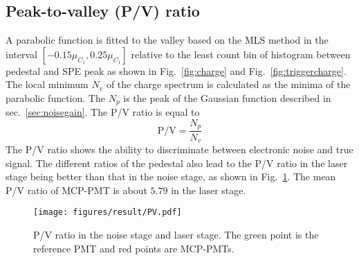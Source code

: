 \subsection{Peak-to-valley (P/V) ratio}
A parabolic function is fitted to the valley based on the MLS method in the interval $[-0.15\mu_{C_1}, 0.25\mu_{C_1}]$ relative to the least count bin of histogram between pedestal and SPE peak as shown in Fig.~\ref{fig:charge} and Fig.~\ref{fig:triggercharge}. The local minimum $N_v$ of the charge spectrum is calculated as the minima of the parabolic function. The $N_p$ is the peak of the Gaussian function described in sec.~\ref{sec:noisegain}. The P/V ratio is equal to  
\begin{equation}
    \mathrm{P/V}=\frac{N_p}{N_v}
\end{equation}
The P/V ratio shows the ability to discriminate between electronic noise and true signal. The different ratios of the pedestal also lead to the P/V ratio in the laser stage being better than that in the noise stage, as shown in Fig.~\ref{fig:PVCompare}. The mean P/V ratio of MCP-PMT is about $5.79$ in the laser stage.
\begin{figure}[!htbp]
    \centering
    \texttt{[image: figures/result/PV.pdf]}
    \caption{P/V ratio in the noise stage and laser stage. The green point is the reference PMT and red points are MCP-PMTs.} 
    \label{fig:PVCompare}
\end{figure}

